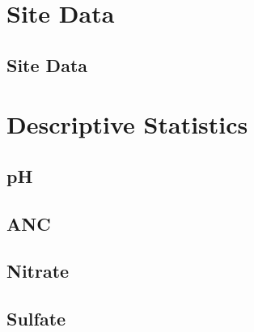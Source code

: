 \chapter{Site Data}\pagebreak

	\section{Site Data}
		\pagebreak

		\pagebreak


\chapter{Descriptive Statistics}\label{sec:DescriptiveStats}\pagebreak
	
	\section{pH}
		\pagebreak

	\section{ANC}
		\pagebreak

	\section{Nitrate}
		\pagebreak

	\section{Sulfate}
		\pagebreak




